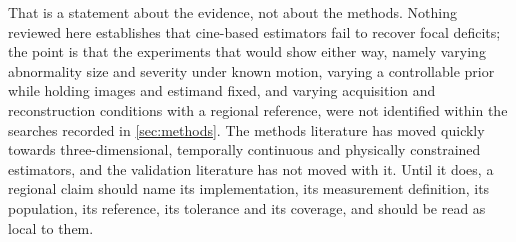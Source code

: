 That is a statement about the evidence, not about the methods. Nothing reviewed here establishes
that cine-based estimators fail to recover focal deficits; the point is that the experiments that
would show either way, namely varying abnormality size and severity under known motion, varying a
controllable prior while holding images and estimand fixed, and varying acquisition and
reconstruction conditions with a regional reference, were not identified within the searches
recorded in \cref{sec:methods}. The methods
literature has moved quickly towards three-dimensional, temporally continuous and physically
constrained estimators, and the validation literature has not moved with it. Until it does, a
regional claim should name its implementation, its measurement definition, its population, its
reference, its tolerance and its coverage, and should be read as local to them.
